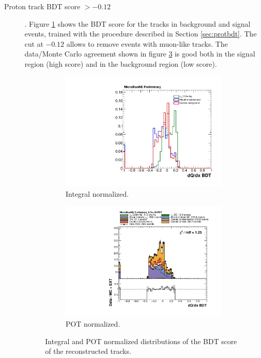 \begin{description}
\item[Proton track BDT score $> -0.12$]. Figure \ref{fig:bdt_norm} shows the BDT score for the tracks in background and signal events, trained with the procedure described in Section \ref{sec:protbdt}. The cut at $-0.12$ allows to remove events with muon-like tracks. The data/Monte Carlo agreement shown in figure \ref{fig:bdt_pot} is good both in the signal region (high score) and in the background region (low score).

\begin{figure}[htbp]
\centering
  \begin{subfigure}{0.45\textwidth}
    \includegraphics[width=\linewidth]{figures/h_dqdx_bdt_norm.pdf}
    \caption{Integral normalized.} \label{fig:bdt_norm}
  \end{subfigure}
    \begin{subfigure}{0.45\textwidth}
    \includegraphics[width=\linewidth]{figures/h_dqdx_bdt.pdf}
    \caption{POT normalized.} \label{fig:bdt_pot}
  \end{subfigure}
  \caption{Integral and POT normalized distributions of the BDT score of the reconstructed tracks.}
\end{figure}



\end{description}
